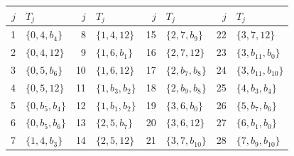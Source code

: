 \begin{tabular}{@{}rlrlrlrl@{}}
\toprule
$j$ & $T_j$ & $j$ & $T_j$ & $j$ & $T_j$ & $j$ & $T_j$ \\
\midrule
1 & $\{0,4,b_{4}\}$ & 8 & $\{1,4,12\}$ & 15 & $\{2,7,b_{9}\}$ & 22 & $\{3,7,12\}$ \\
2 & $\{0,4,12\}$ & 9 & $\{1,6,b_{1}\}$ & 16 & $\{2,7,12\}$ & 23 & $\{3,b_{11},b_{0}\}$ \\
3 & $\{0,5,b_{6}\}$ & 10 & $\{1,6,12\}$ & 17 & $\{2,b_{7},b_{8}\}$ & 24 & $\{3,b_{11},b_{10}\}$ \\
4 & $\{0,5,12\}$ & 11 & $\{1,b_{3},b_{2}\}$ & 18 & $\{2,b_{9},b_{8}\}$ & 25 & $\{4,b_{3},b_{4}\}$ \\
5 & $\{0,b_{5},b_{4}\}$ & 12 & $\{1,b_{1},b_{2}\}$ & 19 & $\{3,6,b_{0}\}$ & 26 & $\{5,b_{7},b_{6}\}$ \\
6 & $\{0,b_{5},b_{6}\}$ & 13 & $\{2,5,b_{7}\}$ & 20 & $\{3,6,12\}$ & 27 & $\{6,b_{1},b_{0}\}$ \\
7 & $\{1,4,b_{3}\}$ & 14 & $\{2,5,12\}$ & 21 & $\{3,7,b_{10}\}$ & 28 & $\{7,b_{9},b_{10}\}$ \\
\bottomrule
\end{tabular}
